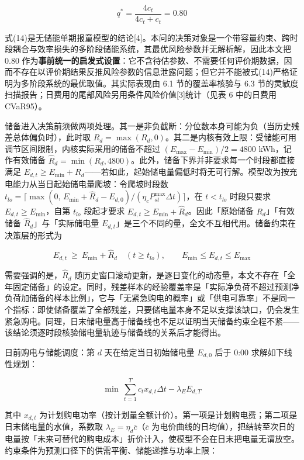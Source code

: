 \documentclass[12pt,a4paper]{ctexart}
\begin{document}
\begin{equation}
q^{*}=\frac{4c_t}{4c_t+c_t}=0.80
\end{equation}

式(14)是无储能单期报童模型的结论[4]。本问的决策对象是一个带容量约束、跨时段耦合与效率损失的多阶段储能系统，其最优风险参数并无解析解，因此本文把 0.80 作为\textbf{事前统一的启发式设置}：它不含待估参数、不需要任何评价期数据，因而不存在以评价期结果反推风险参数的信息泄露问题；但它并不能被式(14)严格证明为多阶段系统的最优取值。其实际表现由 6.1 节的覆盖率核验与 6.3 节的灵敏度扫描报告；日费用的尾部风险另用条件风险价值[3]统计（见表 6 中的日费用 CVaR95）。

储备进入决策前须做两项处理。其一是非负截断：分位数本身可能为负（当历史残差总体偏负时），此时取 $R_d=\max(R_d,0)$。其二是内核有效上限：受储能可用调节区间限制，内核实际采用的储备不超过 $(E_{\max}-E_{\min})/2=4800$ kWh，记作有效储备 $\widehat{R}_d=\min(R_d,4800)$。此外，储备下界并非要求每一个时段都直接满足 $E_{d,t}\ge E_{\min}+R_d$——若如此，起始储电量偏低时将无可行解。模型改为按充电能力从当日起始储电量爬坡：令爬坡时段数 $t_{lo}=\lceil\max(0,\,E_{\min}+\widehat{R}_d-E_{d,0})/(\eta_c P_{st}^{\max}\Delta t)\rceil$，在 $t<t_{lo}$ 时段只要求 $E_{d,t}\ge E_{\min}$，自第 $t_{lo}$ 段起才要求 $E_{d,t}\ge E_{\min}+\widehat{R}_d$。因此「原始储备 $R_d$」「有效储备 $\widehat{R}_d$」与「实际储电量 $E_{d,t}$」是三个不同的量，全文不互相代用。储备约束在决策层的形式为

\begin{equation}
E_{d,t}\ \ge\ E_{\min}+\widehat{R}_d\quad(t\ge t_{lo}),\qquad E_{\min}\le E_{d,t}\le E_{\max}
\end{equation}

需要强调的是，$\widehat{R}_d$ 随历史窗口滚动更新，是逐日变化的动态量，本文不存在「全年固定储备」的设定。同时，残差样本的经验覆盖率是「实际净负荷不超过预测净负荷加储备的样本比例」，它与「无紧急购电的概率」或「供电可靠率」不是同一个指标：即使储备覆盖了全部残差，只要储电量本身不足以支撑该缺口，仍会发生紧急购电。同理，日末储电量高于储备线也不足以证明当天储备约束全程不紧——该结论须逐时段核验储电量轨迹与储备线的关系后才能得出。

日前购电与储能调度：第 $d$ 天在给定当日初始储电量 $E_{d,0}$ 后于 0:00 求解如下线性规划：

\begin{equation}
\min\ \sum_{t=1}^{T} c_t x_{d,t}\Delta t-\lambda_E E_{d,T}
\end{equation}

其中 $x_{d,t}$ 为计划购电功率（按计划量全额计价）。第一项是计划购电费；第二项是日末储电量的水值，系数取 $\lambda_E=\eta_d\bar{c}$（$\bar{c}$ 为电价曲线的日均值），把结转至次日的电量按「未来可替代的购电成本」折价计入，使模型不会在日末把电量无谓放空。约束条件为预测口径下的供需平衡、储能递推与功率上限：
\end{document}
